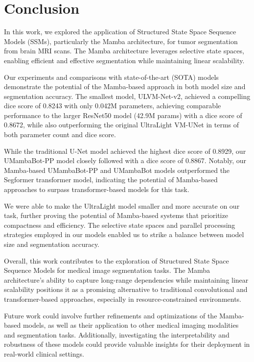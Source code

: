\documentclass[conference]{IEEEtran}
\begin{document}
\section{Conclusion}

In this work, we explored the application of Structured State Space Sequence Models (SSMs), particularly the Mamba architecture, for tumor segmentation from brain MRI scans. The Mamba architecture leverages selective state spaces, enabling efficient and effective segmentation while maintaining linear scalability.

Our experiments and comparisons with state-of-the-art (SOTA) models demonstrate the potential of the Mamba-based approach in both model size and segmentation accuracy. The smallest model, ULVM-Net-v2, achieved a compelling dice score of 0.8243 with only 0.042M parameters, achieving comparable performance to the larger ResNet50 model (42.9M params) with a dice score of 0.8672, while also outperforming the original UltraLight VM-UNet in terms of both parameter count and dice score.

While the traditional U-Net model achieved the highest dice score of 0.8929, our UMambaBot-PP model closely followed with a dice score of 0.8867. Notably, our Mamba-based UMambaBot-PP and UMambaBot models outperformed the Segformer transformer model, indicating the potential of Mamba-based approaches to surpass transformer-based models for this task.

We were able to make the UltraLight model smaller and more accurate on our task, further proving the potential of Mamba-based systems that prioritize compactness and efficiency. The selective state spaces and parallel processing strategies employed in our models enabled us to strike a balance between model size and segmentation accuracy.

Overall, this work contributes to the exploration of Structured State Space Sequence Models for medical image segmentation tasks. The Mamba architecture's ability to capture long-range dependencies while maintaining linear scalability positions it as a promising alternative to traditional convolutional and transformer-based approaches, especially in resource-constrained environments.

Future work could involve further refinements and optimizations of the Mamba-based models, as well as their application to other medical imaging modalities and segmentation tasks. Additionally, investigating the interpretability and robustness of these models could provide valuable insights for their deployment in real-world clinical settings.
\end{document}
